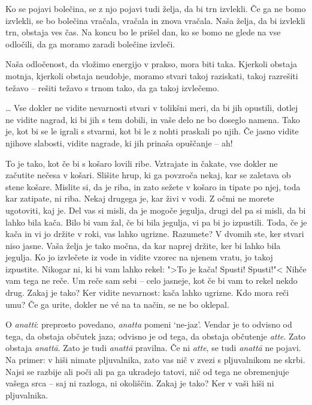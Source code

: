 Ko se pojavi bolečina, se z njo pojavi tudi želja, da bi trn izvlekli. Če ga ne bomo izvlekli, se bo bolečina vračala, vračala in znova vračala. Naša želja, da bi izvlekli trn, obstaja ves čas. Na koncu bo le prišel dan, ko se bomo ne glede na vse odločili, da ga moramo zaradi bolečine izvleči.

Naša odločenost, da vložimo energijo v prakso, mora biti taka. Kjerkoli obstaja motnja, kjerkoli obstaja neudobje, moramo stvari takoj raziskati, takoj razrešiti težavo – rešiti težavo s trnom tako, da ga takoj izvlečemo.

\clearpage


\ldots{} Vse dokler ne vidite nevarnosti stvari v tolikšni meri, da bi jih opustili, dotlej ne vidite nagrad, ki bi jih s tem dobili, in vaše delo ne bo doseglo namena. Tako je, kot bi se le igrali s stvarmi, kot bi le z nohti praskali po njih. Če jasno vidite njihove slabosti, vidite nagrade, ki jih prinaša opuščanje – ah!

To je tako, kot če bi s košaro lovili ribe. Vztrajate in čakate, vse dokler ne začutite nečesa v košari. Slišite hrup, ki ga povzroča nekaj, kar se zaletava ob stene košare. Mislite si, da je riba, in zato sežete v košaro in tipate po njej, toda kar zatipate, ni riba. Nekaj drugega je, kar živi v vodi. Z očmi ne morete ugotoviti, kaj je. Del vas si misli, da je mogoče jegulja, drugi del pa si misli, da bi lahko bila kača. Bilo bi vam žal, če bi bila jegulja, vi pa bi jo izpustili. Toda, če je kača in vi jo držite v roki, vas lahko ugrizne. Razumete? V dvomih ste, ker stvari niso jasne. Vaša želja je tako močna, da kar naprej držite, ker bi lahko bila jegulja. Ko jo izvlečete iz vode in vidite vzorec na njenem vratu, jo takoj izpustite. Nikogar ni, ki bi vam lahko rekel: ">To je kača! Spusti! Spusti!"< Nihče vam tega ne reče. Um reče sam sebi – celo jasneje, kot če bi vam to rekel nekdo drug. Zakaj je tako? Ker vidite nevarnost: kača lahko ugrizne. Kdo mora reči umu? Če ga urite, dokler ne vé na ta način, se ne bo oklepal.

\clearpage


O \emph{anatti}: preprosto povedano, \emph{anatta} pomeni `ne-jaz'. Vendar je to odvisno od tega, da obstaja občutek jaza; odvisno je od tega, da obstaja občutenje \emph{atte}. Zato obstaja \emph{anattā}. Zato je tudi \emph{anattā} pravilna. Če ni \emph{atte}, se tudi \emph{anattā} ne pojavi. Na primer: v hiši nimate pljuvalnika, zato vas nič v zvezi s pljuvalnikom ne skrbi. Najsi se razbije ali poči ali pa ga ukradejo tatovi, nič od tega ne obremenjuje vašega srca – saj ni razloga, ni okoliščin. Zakaj je tako? Ker v vaši hiši ni pljuvalnika.

